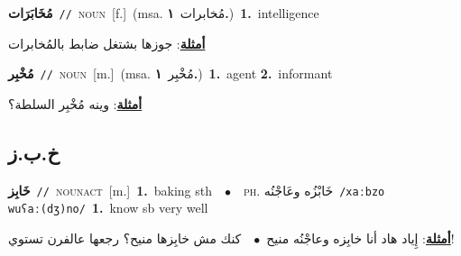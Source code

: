 \documentclass[10pt,a4paper,twoside]{article} %
\begin{document}
\begin{multicols}{2}
{{\setlength\topsep{0pt}\textbf{\foreignlanguage{arabic}{مُخَابَرَات}}\ {\color{gray}\texttt{//}\color{black}}\ \textsc{noun}\ [f.]\ \color{gray}(msa. \foreignlanguage{arabic}{مُخابرات}~\foreignlanguage{arabic}{\textbf{١.}})\color{black}\ \textbf{1.}~intelligence\  \begin{flushright}\color{gray}\foreignlanguage{arabic}{\textbf{\underline{\foreignlanguage{arabic}{أمثلة}}}: جوزها بشتغل ضابط بالمُخابرات}\end{flushright}\color{black}} \vspace{2mm}

{\setlength\topsep{0pt}\textbf{\foreignlanguage{arabic}{مُخْبِر}}\ {\color{gray}\texttt{//}\color{black}}\ \textsc{noun}\ [m.]\ \color{gray}(msa. \foreignlanguage{arabic}{مُخْبِر}~\foreignlanguage{arabic}{\textbf{١.}})\color{black}\ \textbf{1.}~agent  \textbf{2.}~informant\  \begin{flushright}\color{gray}\foreignlanguage{arabic}{\textbf{\underline{\foreignlanguage{arabic}{أمثلة}}}: وينه مُخْبِر السلطة؟}\end{flushright}\color{black}} \vspace{2mm}

\vspace{-3mm}
\subsection*{\color{blue}\foreignlanguage{arabic}{خ.ب.ز}\color{blue}{}} 

{\setlength\topsep{0pt}\textbf{\foreignlanguage{arabic}{خَابِز}}\ {\color{gray}\texttt{//}\color{black}}\ \textsc{noun\textunderscore act}\ [m.]\ \textbf{1.}~baking sth\ \ $\bullet$\ \ \textsc{ph.} \color{gray} \foreignlanguage{arabic}{خَابْزُه وعَاجْنُه}\color{black}\ {\color{gray}\texttt{/{\sffamily xaːbzo wuʕaː(dʒ)no}/}\color{black}}\ \textbf{1.}~know sb very well\  \begin{flushright}\color{gray}\foreignlanguage{arabic}{\textbf{\underline{\foreignlanguage{arabic}{أمثلة}}}: إِياد هاد أنا خابِزه وعاجْنُه منيح\ $\bullet$\ \  كنك مش خابِزها منيح؟ رجعها عالفرن تستوي!}\end{flushright}\color{black}} \vspace{2mm}

}
\end{multicols}
\end{document}
